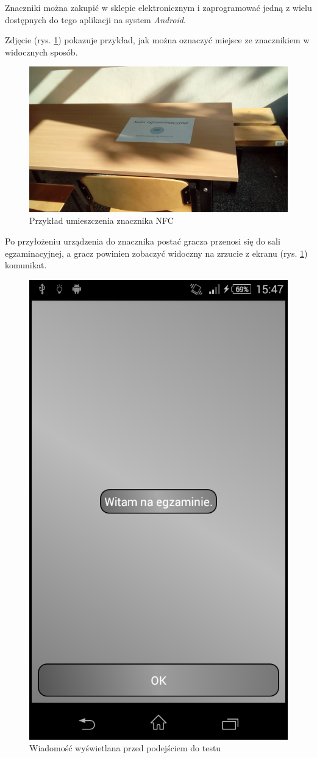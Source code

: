\documentclass[openright]{xmgr}
\begin{document}
Znaczniki można zakupić w sklepie elektronicznym i zaprogramować jedną z wielu dostępnych do tego aplikacji na system \textit{Android}.

Zdjęcie (rys. \ref{game:tag:example}) pokazuje przykład, jak można oznaczyć miejsce ze znacznikiem w widocznych sposób.
\begin{figure}[!tbh]
	\centering
	\includegraphics[width=0.8\hsize]{fig/tag_example}
	\caption{Przykład umieszczenia znacznika NFC}
	\label{game:tag:example}
\end{figure}

Po przyłożeniu urządzenia do znacznika postać gracza przenosi się do sali egzaminacyjnej, a gracz powinien zobaczyć widoczny na zrzucie z ekranu (rys. \ref{game:tag:example}) komunikat.

\begin{figure}[!tbh]
	\centering
	\includegraphics[width=0.4\hsize]{fig/exam_message}
	\caption{Wiadomość wyświetlana przed podejściem do testu}
	\label{screen:exam:message}
\end{figure}
\end{document}
